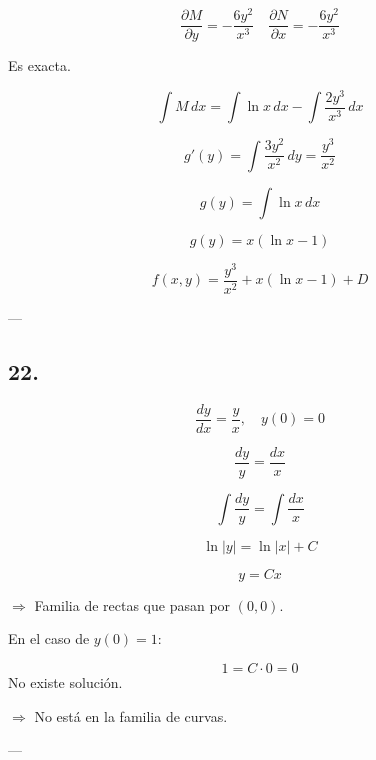 \documentclass[a4paper,12pt]{article}
\begin{document}
\[
\frac{\partial M}{\partial y} = -\frac{6y^2}{x^3} 
\quad 
\frac{\partial N}{\partial x} = -\frac{6y^2}{x^3}
\]

Es exacta.

\[
\int M\, dx = \int \ln x\, dx - \int \frac{2y^3}{x^3}\, dx
\]

\[
g'(y) = \int \frac{3y^2}{x^2}\, dy = \frac{y^3}{x^2}
\]

\[
g(y) = \int \ln x\, dx
\]

\[
g(y) = x (\ln x - 1)
\]

\[
f(x,y) = \frac{y^3}{x^2} + x(\ln x - 1) + D
\]

---

\subsection*{22.}
\[
\frac{dy}{dx} = \frac{y}{x}, \quad y(0) = 0
\]

\[
\frac{dy}{y} = \frac{dx}{x}
\]

\[
\int \frac{dy}{y} = \int \frac{dx}{x}
\]

\[
\ln |y| = \ln |x| + C
\]

\[
y = Cx
\]

$\Rightarrow$ Familia de rectas que pasan por $(0,0)$.

En el caso de $y(0) = 1$:

\[
1 = C \cdot 0 = 0
\]
No existe solución.

$\Rightarrow$ No está en la familia de curvas.

---
\end{document}
